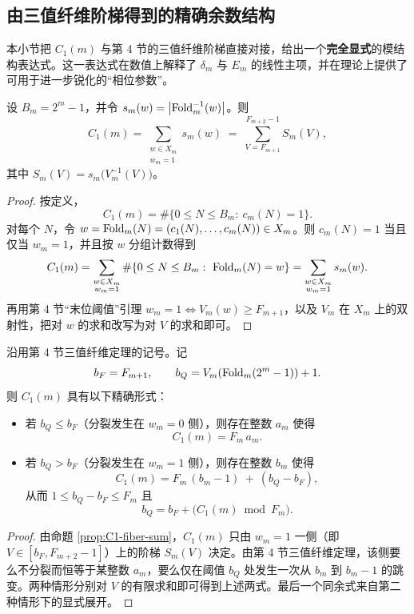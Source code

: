 \subsection{由三值纤维阶梯得到的精确余数结构}

本小节把 $C_1(m)$ 与第 4 节的三值纤维阶梯直接对接，给出一个\textbf{完全显式}的模结构表达式。这一表达式在数值上解释了 $\delta_m$ 与 $E_m$ 的线性主项，并在理论上提供了可用于进一步锐化的“相位参数”。

\begin{proposition}[计数的纤维加权表达式]\label{prop:C1-fiber-sum}
设 $B_m=2^m-1$，并令 $s_m(w)=\left\lvert \mathrm{Fold}_m^{-1}(w)\right\rvert$。则
$$
C_1(m)=\sum_{\substack{w\in X_m\\ w_m=1}} s_m(w)
\;=\;\sum_{V=F_{m+1}}^{F_{m+2}-1} S_m(V),
$$
其中 $S_m(V)=s_m\big(V_m^{-1}(V)\big)$。
\end{proposition}

\begin{proof}
按定义，
$$
C_1(m)=\#\{0\le N\le B_m:\ c_m(N)=1\}.
$$
对每个 $N$，令 $w=\mathrm{Fold}_m(N)=(c_1(N),\dots,c_m(N))\in X_m$。则 $c_m(N)=1$ 当且仅当 $w_m=1$，并且按 $w$ 分组计数得到
$$
C_1(m)=\sum_{\substack{w\in X_m\\ w_m=1}} \#\{0\le N\le B_m:\ \mathrm{Fold}_m(N)=w\}
 =\sum_{\substack{w\in X_m\\ w_m=1}} s_m(w).
$$
再用第 4 节“末位阈值”引理 $w_m=1\iff V_m(w)\ge F_{m+1}$，以及 $V_m$ 在 $X_m$ 上的双射性，把对 $w$ 的求和改写为对 $V$ 的求和即可。
\end{proof}

\begin{corollary}[分裂余数形式]\label{cor:C1-remainder-structure}
沿用第 4 节三值纤维定理的记号。记
$$
b_F=F_{m+1},\qquad b_Q=V_m(\mathrm{Fold}_m(2^m-1))+1.
$$
则 $C_1(m)$ 具有以下精确形式：
\begin{itemize}
\item 若 $b_Q\le b_F$（分裂发生在 $w_m=0$ 侧），则存在整数 $a_m$ 使得
$$
C_1(m)=F_m\,a_m.
$$
\item 若 $b_Q>b_F$（分裂发生在 $w_m=1$ 侧），则存在整数 $b_m$ 使得
$$
C_1(m)=F_m\,(b_m-1)\ +\ (b_Q-b_F),
$$
从而 $1\le b_Q-b_F\le F_m$ 且
$$
b_Q=b_F+\big(C_1(m)\bmod F_m\big).
$$
\end{itemize}
\end{corollary}

\begin{proof}
由命题 \ref{prop:C1-fiber-sum}，$C_1(m)$ 只由 $w_m=1$ 一侧（即 $V\in[b_F,F_{m+2}-1]$）上的阶梯 $S_m(V)$ 决定。由第 4 节三值纤维定理，该侧要么不分裂而恒等于某整数 $a_m$，要么仅在阈值 $b_Q$ 处发生一次从 $b_m$ 到 $b_m-1$ 的跳变。两种情形分别对 $V$ 的有限求和即可得到上述两式。最后一个同余式来自第二种情形下的显式展开。
\end{proof}

